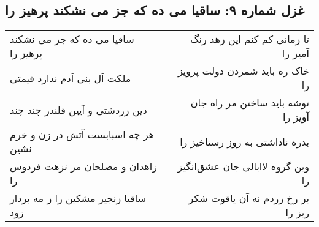 \begin{center}
\section*{غزل شماره ۹: ساقیا می ده که جز می نشکند پرهیز را}
\label{sec:009}
\begin{longtable}{l p{0.5cm} r}
ساقیا می ده که جز می نشکند پرهیز را
&&
تا زمانی کم کنم این زهد رنگ آمیز را
\\
ملکت آل بنی آدم ندارد قیمتی
&&
خاک ره باید شمردن دولت پرویز را
\\
دین زردشتی و آیین قلندر چند چند
&&
توشه باید ساختن مر راه جان آویز را
\\
هر چه اسبابست آتش در زن و خرم نشین
&&
بدرهٔ ناداشتی به روز رستاخیز را
\\
زاهدان و مصلحان مر نزهت فردوس را
&&
وین گروه لاابالی جان عشق‌انگیز را
\\
ساقیا زنجیر مشکین را ز مه بردار زود
&&
بر رخ زردم نه آن یاقوت شکر ریز را
\\
\end{longtable}
\end{center}
